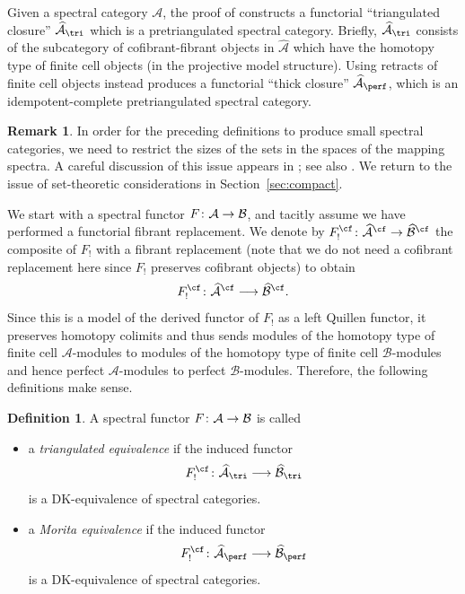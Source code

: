 \documentclass{amsart}
\renewcommand{\to}{\mathchoice{\longrightarrow}{\rightarrow}{\rightarrow}{\rightarrow}}
\let\catsymbfont\mathcal
\newcommand{\aA}{{\catsymbfont{A}}}
\newcommand{\aB}{{\catsymbfont{B}}}
\newcommand{\too}{\longrightarrow}%
\numberwithin{equation}{section}
\theoremstyle{definition}
\newtheorem{definition}[equation]{Definition}
\newtheorem{remark}[equation]{Remark}
\begin{document}
Given a spectral category $\aA$, the proof of \cite[4.5]{BM}
constructs a functorial ``triangulated closure''
$\widehat{\aA}_{\tri}$ which is a pretriangulated spectral category.
Briefly, $\widehat{\aA}_{\tri}$ consists of the subcategory of
cofibrant-fibrant objects in $\widehat{\aA}$ which have the homotopy
type of finite cell objects (in the projective model structure).
Using retracts of finite cell objects instead \cite[4.5]{BM} produces
a functorial ``thick closure'' $\widehat{\aA}_{\perf}$, which is an
idempotent-complete pretriangulated spectral category.  

\begin{remark}\label{rem:spectralcard}
In order for the preceding definitions to produce small spectral
categories, we need to restrict the sizes of the sets in the spaces of
the mapping spectra.  A careful discussion of this issue appears
in \cite[\S 4]{BM}; see also \cite{BM3}.  We return to the issue of
set-theoretic considerations in Section~\ref{sec:compact}.
\end{remark}

We start with a spectral functor $F \colon \aA \to \aB$, and tacitly
assume we have performed a functorial fibrant replacement.  We denote by 
$F_!^{\cf} \colon \widehat{\aA}^{\cf}\to\widehat{\aB}^{\cf}$ the
composite of $F_!$ with a fibrant replacement (note that we do not
need a cofibrant replacement here since $F_!$ preserves cofibrant
objects) to obtain 
\[ 
F_!^{\cf}\colon\widehat{\aA}^{\cf}\to\widehat{\aB}^{\cf}.
\]
Since this is a model of the derived functor of $F_!$ as a left
Quillen functor, it preserves homotopy colimits and thus 
sends modules of the homotopy type of finite cell $\aA$-modules to
modules of the homotopy type of finite cell $\aB$-modules and hence 
perfect $\aA$-modules to perfect $\aB$-modules.  Therefore, the
following definitions make sense.

\begin{definition}\label{def:Morita}
A spectral functor $F\colon \aA\to\aB$ is called

\begin{itemize}
\item a {\em triangulated equivalence} if
the induced functor
\[
F_!^{\cf}\colon \widehat{\aA}_{\tri} \to \widehat{\aB}_{\tri}
\]
is a DK-equivalence of spectral categories.

\item a {\em Morita equivalence} if the induced functor
\[
F_!^{\cf}\colon \widehat{\aA}_{\perf} \too \widehat{\aB}_{\perf}
\]
is a DK-equivalence of spectral categories.
\end{itemize}
\end{definition}
\end{document}
